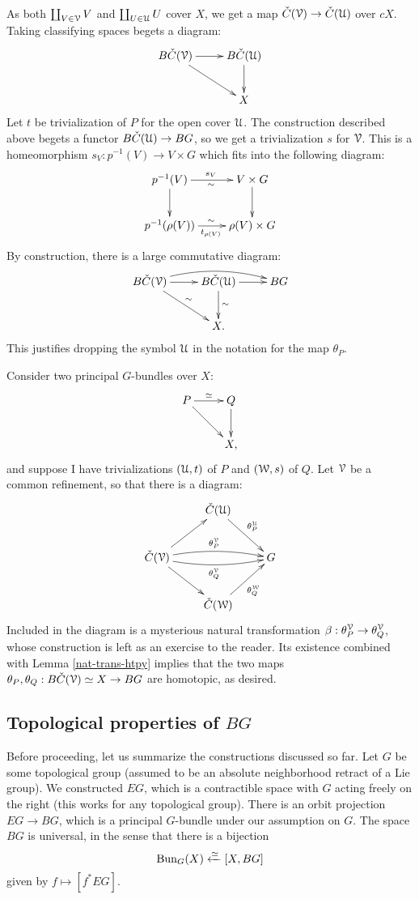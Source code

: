 As both $\coprod_{V\in \mathcal V} V$ and $\coprod_{U\in\mathcal U} U$ cover $X$, we get a
map $\check{C}(\mathcal V)\to \check{C}(\mathcal U)$ over $cX$. Taking classifying spaces begets a
diagram:
$$
\xymatrix{
    B\cCC(\cV)\ar[r]\ar[dr] & B\cCC(\cU)\ar[d]\\
    & X
}
$$
Let $t$ be trivialization of $P$ for the open cover $\mathcal U$. The construction
described above begets a functor $B\check{C}(\mathcal U)\to BG$, so we get a trivialization
$s$ for $\mathcal V$. This is a homeomorphism $s_V:p^{-1}(V)\to V\times G$ which fits
into the following diagram:
\begin{equation*}
    \xymatrix{
	p^{-1}(V)\ar[r]^{s_V}_\sim\ar[d] & V\times G\ar[d]\\
	p^{-1}(\rho(V))\ar[r]_{t_{\rho(V)}}^\sim & \rho(V)\times G
    }
\end{equation*}
By construction, there is a large commutative diagram:
\begin{equation*}
\xymatrix{
    B\cCC(\cV)\ar[r]\ar[dr]^\sim\ar@/^0.135in/[rr] &
    B\cCC(\cU)\ar[d]^\sim\ar[r] & BG\\
    & X.
}
\end{equation*}
This justifies dropping the symbol $\mathcal U$ in the notation for the map
$\theta_P$.

Consider two principal $G$-bundles over $X$:
\begin{equation*}
    \xymatrix{
	P\ar[r]^{\simeq} \ar[dr] & Q\ar[d]\\
	& X,
    }
\end{equation*}
and suppose I have trivializations $(\mathcal U, t)$ of $P$ and $(\mathcal W, s)$ of $Q$.
Let $\mathcal V$ be a common refinement, so that there is a diagram:
\begin{equation*}
    \xymatrix{
	& \cCC(\cU)\ar[dr]^{\theta^\cU_{P}} & \\
	\cCC(\cV)\ar[ur]\ar[dr] \ar@/^/[rr]^{\theta^\cV_P}
	\ar@/_/[rr]_{\theta^\cV_Q} & & G\\
	& \cCC(\cW)\ar[ur]_{\theta^\cW_Q}
    }
\end{equation*}
Included in the diagram is a mysterious natural transformation
$\beta:\theta^\mathcal V_P\to \theta^\mathcal V_Q$, whose construction is left as an exercise
to the reader. Its
existence combined with Lemma \ref{nat-trans-htpy} implies that the two maps
$\theta_P,\theta_Q:B\check{C}(\mathcal V)\simeq X\to BG$ are homotopic, as desired.

\subsection{Topological properties of $BG$}
Before proceeding, let us summarize the constructions discussed so far. Let $G$
be some topological group (assumed to be an absolute neighborhood retract of a
Lie group). We constructed $EG$, which is a contractible space with $G$ acting
freely on the right (this works for any topological group). There is an orbit
projection $EG\to BG$, which is a principal $G$-bundle under our assumption on
$G$. The space $BG$ is universal, in the sense that there is a bijection
$$\mathrm{Bun}_G(X)\xleftarrow{\simeq} [X, BG]$$
given by $f\mapsto [f^\ast EG]$.

